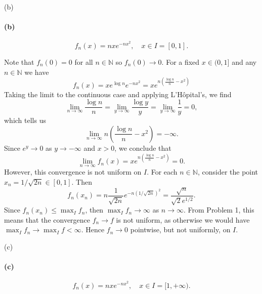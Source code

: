 \documentclass[12pt]{article}
\newenvironment{fullbox}{\begin{lrbox}{\savefullbox}\begin{minipage}{\dimexpr\textwidth-2\fboxsep\relax}}{\end{minipage}\end{lrbox}\begin{center}\framebox[\textwidth]{\usebox{\savefullbox}}\end{center}}
\newenvironment{pbox}[1][]{\begin{fullbox}\ifx#1\empty\else\paragraph{#1}\fi}{\end{fullbox}}
\theoremstyle{definition}
\newcommand{\N}{\mathbb{N}}
\begin{document}
\begin{pbox}[(b)]
    \begin{equation}
    f_n(x) = nxe^{-nx^2},\quad x\in I=[0,1].
    \end{equation}
\end{pbox}

Note that $f_n(0) = 0$ for all $n \in \N$ so $f_n(0) \to 0$. For a fixed $x \in (0, 1]$ and any $n \in \N$ we have
\[
    f_n(x)
        = xe^{\log n}e^{- nx^2}
        = xe^{n\left(\frac{\log n}{n} - x^2\right)}
\]
Taking the limit to the continuous case and applying L'H\^opital's, we find
\[
    \lim_{n\to \infty} \frac{\log n}{n}
        = \lim_{y \to \infty} \frac{\log y}{y}
        = \lim_{y \to \infty} \frac{1}{y}
        = 0,
\]
which tells us
\[
    \lim_{n\to \infty} n\left(\frac{\log n}{n} - x^2\right) = -\infty.
\]
Since $e^y \to 0$ as $y \to -\infty$ and $x > 0$, we conclude that
\[
    \lim_{n\to \infty} f_n(x)
        = xe^{n\left(\frac{\log n}{n} - x^2\right)}
        = 0.
\]
However, this convergence is not uniform on $I$. For each $n \in \N$, consider the point $x_n = 1/\sqrt{2n} \in [0,1]$. Then
\[
    f_n(x_n)
        = n\frac{1}{\sqrt{2n}}e^{-n(1/\sqrt{2n})^2}
        = \frac{\sqrt{n}}{\sqrt{2} e^{1/2}}.
\]
Since $f_n(x_n) \leq \max_I f_n$, then $\max_I f_n \to \infty$ as $n \to \infty$. From Problem 1, this means that the convergence $f_n \to f$ is not uniform, as otherwise we would have $\max_I f_n \to \max_I f < \infty$. Hence $f_n \to 0$ pointwise, but not uniformly, on $I$.




\newpage
\begin{pbox}[(c)]
    \begin{equation}
    f_n(x) = nxe^{-nx^2},\quad x\in I=[1,+\infty).
    \end{equation}
\end{pbox}
\end{document}
